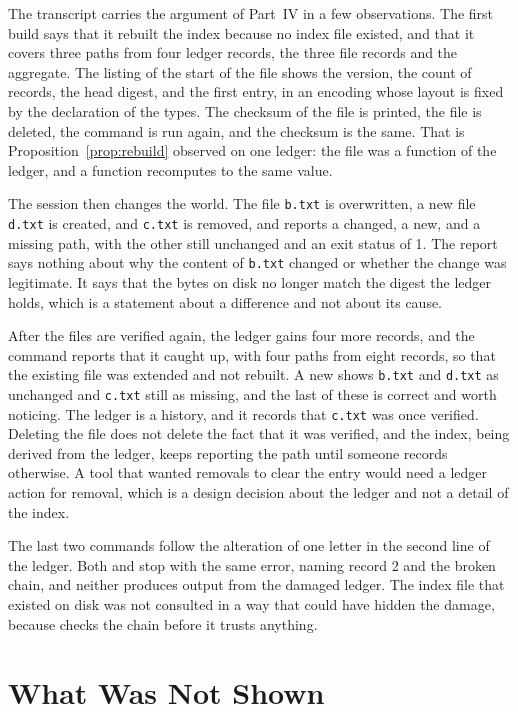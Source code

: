 The transcript carries the argument of Part~IV in a few observations. The first build says that it rebuilt the index because no index file existed, and that it covers three paths from four ledger records, the three file records and the aggregate. The listing of the start of the file shows the version, the count of records, the head digest, and the first entry, in an encoding whose layout is fixed by the declaration of the types. The checksum of the file is printed, the file is deleted, the command is run again, and the checksum is the same. That is Proposition~\ref{prop:rebuild} observed on one ledger: the file was a function of the ledger, and a function recomputes to the same value.

The session then changes the world. The file \texttt{b.txt} is overwritten, a new file \texttt{d.txt} is created, and \texttt{c.txt} is removed, and  reports a changed, a new, and a missing path, with the other still unchanged and an exit status of 1. The report says nothing about why the content of \texttt{b.txt} changed or whether the change was legitimate. It says that the bytes on disk no longer match the digest the ledger holds, which is a statement about a difference and not about its cause.

After the files are verified again, the ledger gains four more records, and the command  reports that it caught up, with four paths from eight records, so that the existing file was extended and not rebuilt. A new  shows \texttt{b.txt} and \texttt{d.txt} as unchanged and \texttt{c.txt} still as missing, and the last of these is correct and worth noticing. The ledger is a history, and it records that \texttt{c.txt} was once verified. Deleting the file does not delete the fact that it was verified, and the index, being derived from the ledger, keeps reporting the path until someone records otherwise. A tool that wanted removals to clear the entry would need a ledger action for removal, which is a design decision about the ledger and not a detail of the index.

The last two commands follow the alteration of one letter in the second line of the ledger. Both  and  stop with the same error, naming record 2 and the broken chain, and neither produces output from the damaged ledger. The index file that existed on disk was not consulted in a way that could have hidden the damage, because  checks the chain before it trusts anything.

\section{What Was Not Shown}

